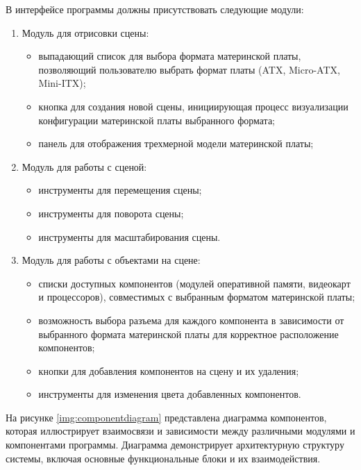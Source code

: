 В интерфейсе программы должны присутствовать следующие модули:
\begin{enumerate}[label=\arabic*)]
	\item Модуль для отрисовки сцены:
	\begin{itemize}[label=---]
		\item выпадающий список для выбора формата материнской платы, позволяющий пользователю выбрать формат платы (ATX, Micro-ATX, Mini-ITX);
		\item кнопка для создания новой сцены, инициирующая процесс визуализации конфигурации  материнской платы выбранного формата;
		\item панель для отображения трехмерной модели материнской платы;
	\end{itemize}
	\item Модуль для работы с сценой:
	\begin{itemize}[label=---]
		\item инструменты для перемещения сцены;
		\item инструменты для поворота сцены;
		\item инструменты для масштабирования сцены.
	\end{itemize}
	\item Модуль для работы с объектами на сцене:
	\begin{itemize}[label=---]
		\item списки доступных компонентов (модулей оперативной памяти, видеокарт и процессоров), совместимых с выбранным форматом материнской платы;
		\item возможность выбора разъема для каждого компонента в зависимости от выбранного формата материнской платы для корректное расположение компонентов;
		\item кнопки для добавления компонентов на сцену и их удаления;
		\item инструменты для изменения цвета добавленных компонентов.
	\end{itemize}
\end{enumerate}

На рисунке \ref{img:componentdiagram} представлена диаграмма компонентов, которая иллюстрирует взаимосвязи и зависимости между различными модулями и компонентами программы. Диаграмма демонстрирует архитектурную структуру системы, включая основные функциональные блоки и их взаимодействия.

\newpage

